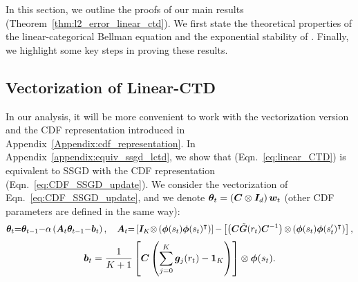 In this section, we outline the proofs of our main results (Theorem~\ref{thm:l2_error_linear_ctd}).
We first state the theoretical properties of the linear-categorical Bellman equation and the exponential stability of {\LCTD}. 
Finally, we highlight some key steps in proving these results.
\subsection{Vectorization of Linear-CTD}
In our analysis, it will be more convenient to work with the vectorization version and the CDF representation introduced in Appendix~\ref{Appendix:cdf_representation}. 
In Appendix~\ref{appendix:equiv_ssgd_lctd}, we show that {\LCTD} (Eqn.~\eqref{eq:linear_CTD}) is equivalent to SSGD with the CDF representation (Eqn.~\eqref{eq:CDF_SSGD_update}).
We consider the vectorization of Eqn.~\eqref{eq:CDF_SSGD_update}, and we denote ${\bm{\theta}}_t=\left({{\bm{C}}\otimes{\bm{I}}_d}\right){\bm{w}}_t$ (other CDF parameters are defined in the same way):
\begin{equation*}
\begin{aligned}
    {\bm{\theta}}_t{=}{\bm{\theta}}_{t-1}{-}\alpha\left({{\bm{A}}_{t}{\bm{\theta}}_{t-1}{-}{\bm{b}}_t}\right),\quad {\bm{A}}_t{=}\left[{{\bm{I}}_K{\otimes}\left({{\bm{\phi}}(s_t){\bm{\phi}}(s_t)^{\intercal}}\right)}\right]{-}\left[{\left({{\bm{C}}\tilde{{\bm{G}}}(r_t){\bm{C}}^{-1}}\right){\otimes}\left({{\bm{\phi}}(s_t){\bm{\phi}}(s^\prime_t)^{\intercal}}\right)}\right],
\end{aligned}
\end{equation*}
\begin{equation}\label{eq:bt}
\begin{aligned}
        {\bm{b}}_t=\frac{1}{K+1}\left[{{\bm{C}}\left({\sum_{j=0}^K{\bm{g}}_j(r_t)-\bm{1}_K}\right)}\right]\otimes{\bm{\phi}}(s_t).
\end{aligned}
\end{equation}
